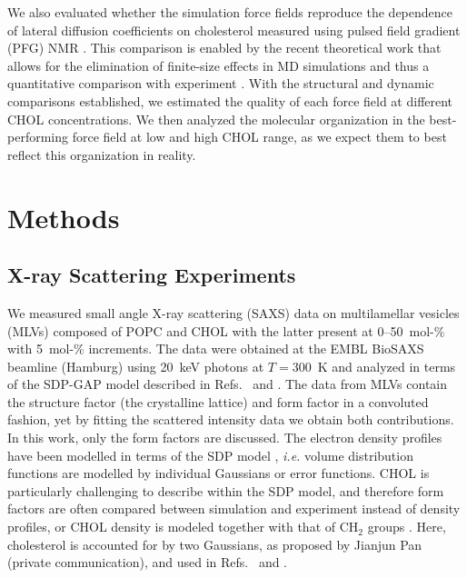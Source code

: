 \documentclass[aps,prl,superscriptaddress]{revtex4-2}
\begin{document}
We also evaluated whether the simulation force fields reproduce the dependence of lateral diffusion coefficients on cholesterol measured using pulsed field gradient (PFG) NMR \cite{filippov2003effect,filippov2003influence}. This comparison is enabled by the recent theoretical work that allows for the elimination of finite-size effects in MD simulations and thus a quantitative comparison with experiment \cite{vogele2016divergent,vogele2018hydrodynamics}. With the structural and dynamic comparisons established, we estimated the quality of each force field at different CHOL concentrations. We then analyzed the molecular organization in the best-performing force field at low and high CHOL range, as we expect them to best reflect this organization in reality.

\section{Methods}

\subsection{X-ray Scattering Experiments}



We measured small angle X-ray scattering (SAXS) data on multilamellar vesicles (MLVs) composed of POPC and CHOL with the latter present at 0--50~mol-\% with 5~mol-\% increments. The data were obtained at the EMBL BioSAXS beamline (Hamburg) using 20~keV photons at $T=300$~K and analyzed in terms of the SDP-GAP model described in Refs.~ and . The data from MLVs contain the structure factor (the crystalline lattice) and form factor in a convoluted fashion, yet by fitting the scattered intensity data we obtain both contributions. In this work, only the form factors are discussed. The electron density profiles have been modelled in terms of the SDP model \cite{heberle12,Kucerka08a,kucerka12}, \textit{i.e.} volume distribution functions are modelled by individual Gaussians or error functions. CHOL is particularly challenging to describe within the SDP model, and therefore form factors are often compared between simulation and experiment \cite{Kucerka08b} instead of density profiles, or CHOL density is modeled together with that of CH$_2$ groups \cite{pan12}. Here, cholesterol is accounted for by two Gaussians, as proposed by Jianjun Pan (private communication), and used in Refs.~ and . 
\end{document}
